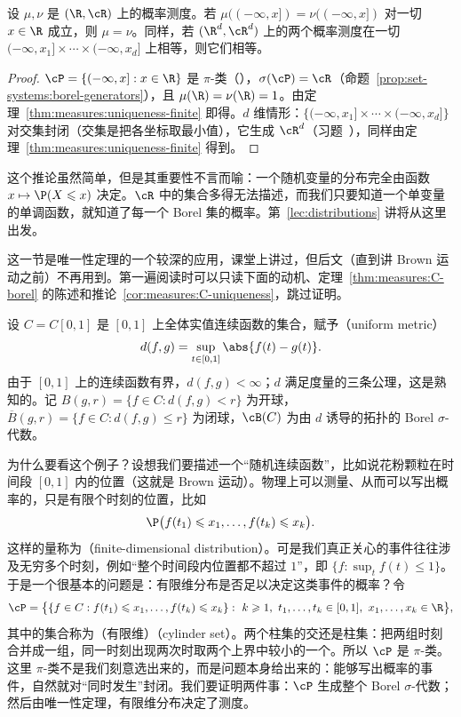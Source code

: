 \begin{corollary}\label{cor:measures:distribution-function}
设 $\mu,\nu$ 是 $(\R,\cR)$ 上的概率测度。若 $\mu((-\infty,x])=\nu((-\infty,x])$ 对一切 $x\in\R$ 成立，则 $\mu=\nu$。同样，若 $(\R^d,\cR^d)$ 上的两个概率测度在一切 $(-\infty,x_1]\times\cdots\times(-\infty,x_d]$ 上相等，则它们相等。
\end{corollary}
\begin{proof}
$\cP=\{(-\infty,x]:x\in\R\}$ 是 $\pi$-类（），$\sigma(\cP)=\cR$（命题~\ref{prop:set-systems:borel-generators}），且 $\mu(\R)=\nu(\R)=1$。由定理~\ref{thm:measures:uniqueness-finite} 即得。$d$ 维情形：$\{(-\infty,x_1]\times\cdots\times(-\infty,x_d]\}$ 对交集封闭（交集是把各坐标取最小值），它生成 $\cR^d$（习题~），同样由定理~\ref{thm:measures:uniqueness-finite} 得到。
\end{proof}

这个推论虽然简单，但是其重要性不言而喻：一个随机变量的分布完全由函数 $x\mapsto \P(X\leqslant x)$ 决定。$\cR$ 中的集合多得无法描述，而我们只要知道一个单变量的单调函数，就知道了每一个 Borel 集的概率。第~\ref{lec:distributions} 讲将从这里出发。


这一节是唯一性定理的一个较深的应用，课堂上讲过，但后文（直到讲 Brown 运动之前）不再用到。第一遍阅读时可以只读下面的动机、定理~\ref{thm:measures:C-borel} 的陈述和推论~\ref{cor:measures:C-uniqueness}，跳过证明。

设 $C=C[0,1]$ 是 $[0,1]$ 上全体实值连续函数的集合，赋予（uniform metric）
\[
d(f,g)=\sup_{t\in[0,1]}\abs{f(t)-g(t)}.
\]
由于 $[0,1]$ 上的连续函数有界，$d(f,g)<\infty$；$d$ 满足度量的三条公理，这是熟知的。记 $B(g,r)=\{f\in C:d(f,g)<r\}$ 为开球，$\overline B(g,r)=\{f\in C:d(f,g)\leqslant r\}$ 为闭球，$\cB(C)$ 为由 $d$ 诱导的拓扑的 Borel $\sigma$-代数。

为什么要看这个例子？设想我们要描述一个“随机连续函数”，比如说花粉颗粒在时间段 $[0,1]$ 内的位置（这就是 Brown 运动）。物理上可以测量、从而可以写出概率的，只是有限个时刻的位置，比如
\[
\P\bigl(f(t_1)\leqslant x_1,\dots,f(t_k)\leqslant x_k\bigr).
\]
这样的量称为（finite-dimensional distribution）。可是我们真正关心的事件往往涉及无穷多个时刻，例如“整个时间段内位置都不超过 $1$”，即 $\{f:\sup_tf(t)\leqslant1\}$。于是一个很基本的问题是：有限维分布是否足以决定这类事件的概率？令
\[
\cP=\bigl\{\{f\in C: f(t_1)\leqslant x_1,\dots,f(t_k)\leqslant x_k\}:\ k\geqslant1,\ t_1,\dots,t_k\in[0,1],\ x_1,\dots,x_k\in\R\bigr\},
\]
其中的集合称为（有限维）（cylinder set）。两个柱集的交还是柱集：把两组时刻合并成一组，同一时刻出现两次时取两个上界中较小的一个。所以 $\cP$ 是 $\pi$-类。这里 $\pi$-类不是我们刻意选出来的，而是问题本身给出来的：能够写出概率的事件，自然就对“同时发生”封闭。我们要证明两件事：$\cP$ 生成整个 Borel $\sigma$-代数；然后由唯一性定理，有限维分布决定了测度。

